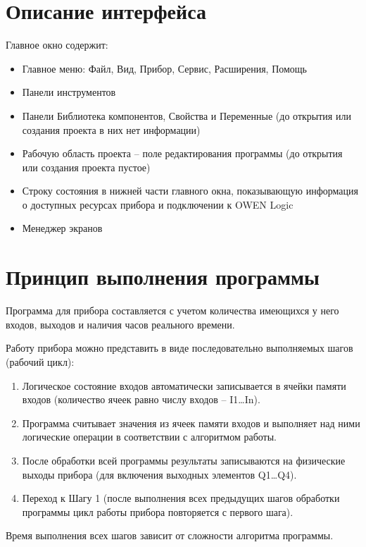 \section{Описание интерфейса}
Главное окно содержит:
\begin{itemize}
    \item Главное меню: Файл, Вид, Прибор, Сервис, Расширения, Помощь
    \item Панели инструментов
    \item Панели Библиотека компонентов, Свойства и Переменные (до открытия или создания проекта в них нет информации)
    \item Рабочую область проекта -- поле редактирования программы (до открытия или создания проекта пустое)
    \item Строку состояния в нижней части главного окна, показывающую информация о доступных ресурсах прибора и подключении к OWEN Logic
    \item Менеджер экранов
\end{itemize}

\section{Принцип выполнения программы}
Программа для прибора составляется с учетом количества имеющихся у него входов, выходов и наличия часов реального времени.

Работу прибора можно представить в виде последовательно выполняемых шагов (рабочий цикл):
\begin{enumerate}
    \item Логическое состояние входов автоматически записывается в ячейки памяти входов (количество ячеек равно числу входов -- I1\dots In).
    \item Программа считывает значения из ячеек памяти входов и выполняет над ними логические операции в соответствии с алгоритмом работы.
    \item После обработки всей программы результаты записываются на физические выходы прибора (для включения выходных элементов Q1\dots Q4).
    \item Переход к Шагу 1 (после выполнения всех предыдущих шагов обработки программы цикл работы прибора повторяется с первого шага).
\end{enumerate}
Время выполнения всех шагов зависит от сложности алгоритма программы.